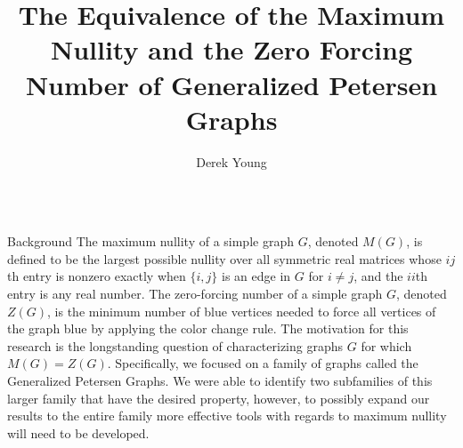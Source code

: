 \documentclass[final]{beamer}
\title{The Equivalence of the Maximum Nullity and the Zero Forcing Number of Generalized Petersen Graphs}
\author{Derek Young }
\institute{Iowa State University, Ames, IA}
\def\red{\color{red}}
\newcommand{\R}{\mathbb{R}}
\newcommand{\Rnn}{\R^{n\times n}}
\newcommand{\bit}{\begin{itemize}}
\begin{document}
\begin{frame}{}
  \begin{columns}[t]

\begin{column}{0.23\linewidth} %

\begin{block}{\red Background}
The maximum nullity of a simple graph $G$, denoted $M(G)$, is defined to be the largest possible nullity over all symmetric real matrices whose $ij$th entry is nonzero exactly when $\{i,j\}$ is an edge in $G$ for $i\neq j$, and the {$ii$}th entry is any real number. The zero-forcing number of a simple graph $G$, denoted $Z(G)$, is the minimum number of blue vertices needed to force all vertices of the graph blue by applying the color change rule. The motivation for this research is the longstanding question of characterizing graphs $G$ for which $M(G)=Z(G)$. Specifically, we focused on a family of graphs called the Generalized Petersen Graphs. We were able to identify two subfamilies of this larger family that have the desired property, however, to possibly expand our results to the entire family more effective tools with regards to maximum nullity will need to be developed.
\end{block}

\end{column}
\end{columns}
\end{frame}
\end{document}
